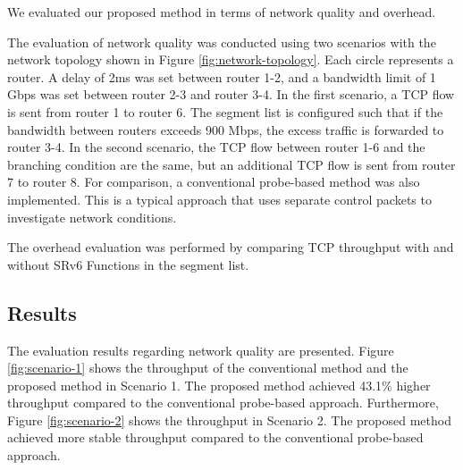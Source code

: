 \documentclass[conference]{IEEEtran}
\begin{document}
We evaluated our proposed method in terms of network quality and overhead.

The evaluation of network quality was conducted using two scenarios with the network topology shown in Figure \ref{fig:network-topology}.
Each circle represents a router. A delay of 2ms was set between router 1-2, and a bandwidth limit of 1 Gbps was set between router 2-3 and router 3-4.
In the first scenario, a TCP flow is sent from router 1 to router 6. The segment list is configured such that if the bandwidth between routers exceeds 900 Mbps, the excess traffic is forwarded to router 3-4.
In the second scenario, the TCP flow between router 1-6 and the branching condition are the same, but an additional TCP flow is sent from router 7 to router 8.
For comparison, a conventional probe-based method was also implemented. This is a typical approach that uses separate control packets to investigate network conditions.

The overhead evaluation was performed by comparing TCP throughput with and without SRv6 Functions in the segment list.

\subsection{Results}


The evaluation results regarding network quality are presented. Figure \ref{fig:scenario-1} shows the throughput of the conventional method and the proposed method in Scenario 1. The proposed method achieved 43.1\% higher throughput compared to the conventional probe-based approach.
Furthermore, Figure \ref{fig:scenario-2} shows the throughput in Scenario 2. The proposed method achieved more stable throughput compared to the conventional probe-based approach.
\end{document}
